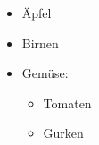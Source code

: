 \documentclass{article}
\begin{document}
  \begin{itemize}
    \item Äpfel
    \item Birnen
    \item Gemüse:
        \begin{itemize}
            \item Tomaten
            \item Gurken
        \end{itemize}
  \end{itemize}
\end{document}
